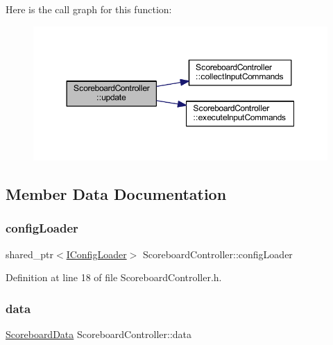 Here is the call graph for this function\+:\nopagebreak
\begin{figure}[H]
\begin{center}
\leavevmode
\includegraphics[width=350pt]{class_scoreboard_controller_a05414b34fd7f4455ddb0ac98490639dc_cgraph}
\end{center}
\end{figure}


\subsection{Member Data Documentation}
\mbox{\label{class_scoreboard_controller_aebcab5e4054ef77db1c9de9ed889e573}} 
\subsubsection{\texorpdfstring{config\+Loader}{configLoader}}
{\footnotesize\ttfamily shared\+\_\+ptr$<$\hyperlink{class_i_config_loader}{I\+Config\+Loader}$>$ Scoreboard\+Controller\+::config\+Loader\hspace{0.3cm}{\ttfamily [private]}}



Definition at line 18 of file Scoreboard\+Controller.\+h.

\mbox{\label{class_scoreboard_controller_af6d8c4336b7c5b71d9d9ccd2f8a3f6d0}} 
\subsubsection{\texorpdfstring{data}{data}}
{\footnotesize\ttfamily \hyperlink{struct_scoreboard_data}{Scoreboard\+Data} Scoreboard\+Controller\+::data\hspace{0.3cm}{\ttfamily [private]}}



